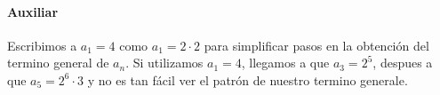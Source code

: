 \begin{enumerate}[label=\roman*)]
    \paragraph{Auxiliar}{
        Escribimos a $a_1 = 4$ como $a_1 = 2 \cdot 2$ para simplificar pasos en la obtención del termino general de 
        $a_n$. Si utilizamos $a_1 = 4$, llegamos a que $a_3 = 2^5$, despues a que $a_5 = 2^6 \cdot 3$ y no es tan fácil 
        ver el patrón de nuestro termino generale.
    }
\end{enumerate}

\begin{aportes}
  \item {}
\end{aportes}
